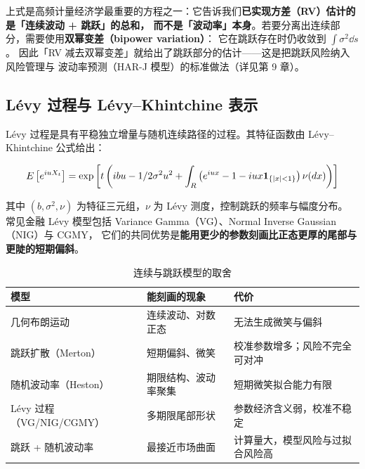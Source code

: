 \begin{keybox}
上式是高频计量经济学最重要的方程之一：它告诉我们\textbf{已实现方差（RV）估计的是「连续波动 + 跳跃」的总和，
而不是「波动率」本身}。若要分离出连续部分，需要使用\textbf{双幂变差（bipower variation）}：
它在跳跃存在时仍收敛到 $\int\sigma^2\dd s$。
因此「RV 减去双幂变差」就给出了跳跃部分的估计——这是把跳跃风险纳入风险管理与
波动率预测（HAR-J 模型）的标准做法（详见第 9 章）。
\end{keybox}

\subsection{Lévy 过程与 L\'evy--Khintchine 表示}

Lévy 过程是具有平稳独立增量与随机连续路径的过程。其特征函数由 L\'evy--Khintchine 公式给出：

\begin{equation}
  E\left[e^{i uX_t}\right] = \exp\left[t\left(i bu-1/2\sigma^{2}u^{2}
  +\int_{R}\left(e^{i ux}-1-i ux\mathbf{1}_{\{\left\lvert x \right\rvert<1\}}\right)\nu(d x)\right)\right]
  \label{eq:10-levy-khintchine}
\end{equation}

其中 $(b,\sigma^2,\nu)$ 为特征三元组，$\nu$ 为 L\'evy 测度，控制跳跃的频率与幅度分布。
常见金融 Lévy 模型包括 Variance Gamma（VG）、Normal Inverse Gaussian（NIG）与 CGMY，
它们的共同优势是\textbf{能用更少的参数刻画比正态更厚的尾部与更陡的短期偏斜}。

\begin{table}[htbp]
\centering
\caption{连续与跳跃模型的取舍}\label{tab:10-jump-tradeoff}
\tablefont
\begin{tabularx}{\textwidth}{@{}L{2.6cm}Y L{3.6cm}@{}}
\toprule
\textbf{模型} & \textbf{能刻画的现象} & \textbf{代价} \\
\midrule
几何布朗运动 & 连续波动、对数正态 & 无法生成微笑与偏斜 \\
跳跃扩散（Merton） & 短期偏斜、微笑 & 校准参数增多；风险不完全可对冲 \\
随机波动率（Heston） & 期限结构、波动率聚集 & 短期微笑拟合能力有限 \\
Lévy 过程（VG/NIG/CGMY） & 多期限尾部形状 & 参数经济含义弱，校准不稳定 \\
跳跃 + 随机波动率 & 最接近市场曲面 & 计算量大，模型风险与过拟合风险高 \\
\bottomrule
\end{tabularx}
\end{table}

